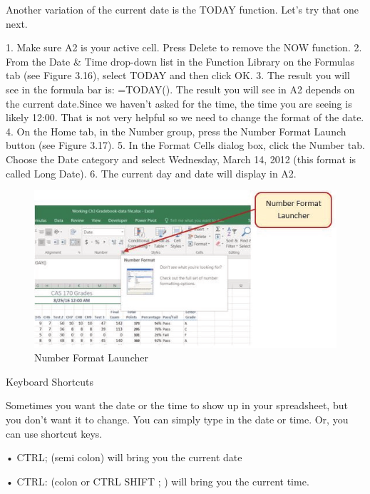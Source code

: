 Another variation of the current date is the TODAY function. Let’s try that one next.

1. Make sure A2 is your active cell. Press Delete to remove the NOW function.
2. From the Date \& Time drop-down list in the Function Library on the Formulas tab (see Figure
3.16), select TODAY and then click OK.
3. The result you will see in the formula bar is: =TODAY(). The result you will see in A2 depends
on the current date.Since we haven’t asked for the time, the time you are seeing is likely 12:00.
That is not very helpful so we need to change the format of the date.
4. On the Home tab, in the Number group, press the Number Format Launch button (see Figure
3.17).
5. In the Format Cells dialog box, click the Number tab. Choose the Date category and select
Wednesday, March 14, 2012 (this format is called Long Date).
6. The current day and date will display in A2.


\begin{figure}[H]
	\centering
	\includegraphics[width=\maxwidth{.95\linewidth}]{gfx/ch03_fig17}
	\caption{Number Format Launcher}
	\label{03:fig17}
\end{figure}





Keyboard Shortcuts


Sometimes you want the date or the time to show up in your spreadsheet, but you don’t want it to change. You can simply
type in the date or time. Or, you can use shortcut keys.

• CTRL; (semi colon) will bring you the current date

• CTRL: (colon or CTRL SHIFT ; ) will bring you the current time.


